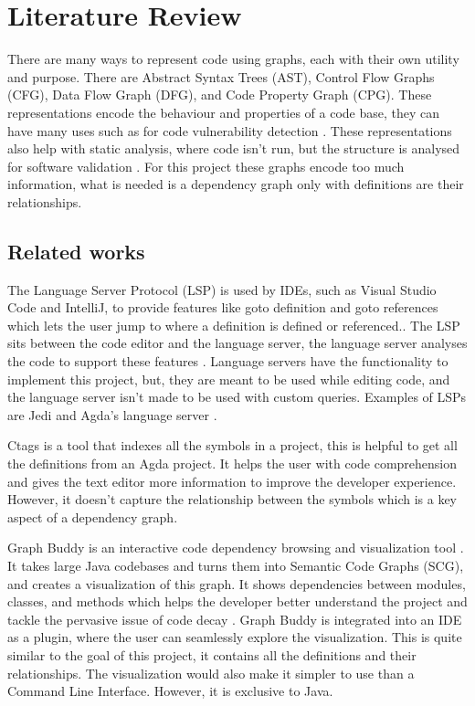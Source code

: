 
\chapter{Literature Review}


There are many ways to represent code using graphs, each with their own utility
and purpose. There are Abstract Syntax Trees (AST), Control Flow Graphs (CFG),
Data Flow Graph (DFG), and Code Property Graph (CPG). These representations
encode the behaviour and properties of a code base, they can have many uses
such as for code vulnerability detection \cite{graph_for_code_vuln}. These
representations also help with static analysis, where code isn't run, but the
structure is analysed for software validation \cite{static_analysis}. For this
project these graphs encode too much information, what is needed is a
dependency graph only with definitions are their relationships.


\section{Related works}

The Language Server Protocol (LSP) is used by IDEs, such as Visual Studio Code
and IntelliJ, to provide features like \textsf{goto} definition and
\textsf{goto} references which lets the user jump to where a definition is
defined or referenced.. The LSP sits between the code editor and the language
server, the language server analyses the code to support these features
\cite{LSP_implementation}. Language servers have the functionality to implement
this project, but, they are meant to be used while editing code, and the
language server isn't made to be used with custom queries. Examples of LSPs are
Jedi \cite{jedi_lsp} and Agda's language server \cite{agda_lsp}.

Ctags \cite{ctags} is a tool that indexes all the symbols in a project, this is
helpful to get all the definitions from an Agda project. It helps the user with
code comprehension and gives the text editor more information to improve the
developer experience. However, it doesn't capture the relationship between the
symbols which is a key aspect of a dependency graph.

Graph Buddy is an interactive code dependency browsing and visualization tool
\cite{graph_buddy}. It takes large Java codebases and turns them into Semantic
Code Graphs (SCG), and creates a visualization of this graph. It shows
dependencies between modules, classes, and methods which helps the developer
better understand the project and tackle the pervasive issue of code decay
\cite{code_decay_evidence}. Graph Buddy is integrated into an IDE as a plugin,
where the user can seamlessly explore the visualization. This is quite similar
to the goal of this project, it contains all the definitions and their
relationships. The visualization would also make it simpler to use than a
Command Line Interface. However, it is exclusive to Java.

